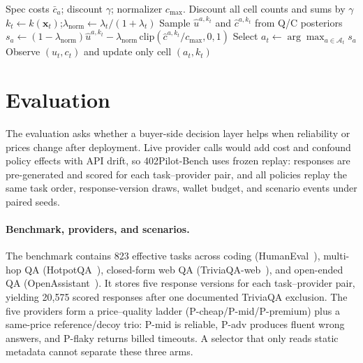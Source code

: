 \documentclass[sigconf, nonacm]{acmart}
\newcommand{\ut}{u_t}
\newcommand{\lamn}{\lambda_{\mathrm{norm}}}
\DeclareRobustCommand{\padct}{PA\nobreakdash-DCT}
\newcommand{\hatu}[2]{\hat u^{#1,#2}}
\newcommand{\hatc}[2]{\hat c^{#1,#2}}
\begin{document}
\begin{algorithm}[t]
\caption{\padct{} policy loop.}
\label{alg:padct-short}
\footnotesize
\begin{algorithmic}[1]
\Require Spec costs $\bar c_a$; discount $\gamma$; normalizer $c_{\max}$.
  \State Discount all cell counts and sums by $\gamma$
  \State $k_t\leftarrow k(\mathbf{x}_t)$;\quad $\lamn\leftarrow\lambda_t/(1+\lambda_t)$
    \State Sample $\hatu{a}{k_t}$ and $\hatc{a}{k_t}$ from Q/C posteriors
    \State $s_a\leftarrow(1-\lamn)\hatu{a}{k_t}-\lamn\,\mathrm{clip}(\hatc{a}{k_t}/c_{\max},0,1)$
  \EndFor
  \State Select $a_t\leftarrow\arg\max_{a\in\mathcal{A}_t}s_a$
  \State Observe $(\ut,c_t)$ and update only cell $(a_t,k_t)$
\EndFor
\end{algorithmic}
\end{algorithm}

\section{Evaluation}
\label{sec:eval}

The evaluation asks whether a buyer-side decision layer helps when reliability or prices change after deployment. Live provider calls would add cost and confound policy effects with API drift, so 402Pilot-Bench uses frozen replay: responses are pre-generated and scored for each task--provider pair, and all policies replay the same task order, response-version draws, wallet budget, and scenario events under paired seeds.

\paragraph{Benchmark, providers, and scenarios.}
The benchmark contains 823 effective tasks across coding (HumanEval~\citep{chen2021humaneval}), multi-hop QA (HotpotQA~\citep{yang2018hotpotqa}), closed-form web QA (TriviaQA-web~\citep{joshi2017triviaqa}), and open-ended QA (OpenAssistant~\citep{kopf2023openassistant}). It stores five response versions for each task--provider pair, yielding 20,575 scored responses after one documented TriviaQA exclusion. The five providers form a price--quality ladder (P-cheap/P-mid/P-premium) plus a same-price reference/decoy trio: P-mid is reliable, P-adv produces fluent wrong answers, and P-flaky returns billed timeouts. A selector that only reads static metadata cannot separate these three arms.
\end{document}
